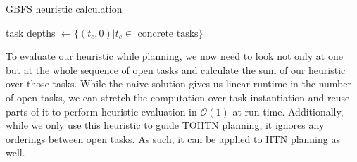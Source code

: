 \begin{algorithm}
	\caption{GBFS heuristic calculation}
	\label{algo: gbfs heuristic}
	task depths $\gets \{(t_c, 0) | t_c \in \text{ concrete tasks}\}$\;
\end{algorithm}
To evaluate our heuristic while planning, we now need to look not only at one but at the whole sequence of open tasks and calculate the sum of our heuristic over those tasks. While the naive solution gives us linear runtime in the number of open tasks, we can stretch the computation over task instantiation and reuse parts of it to perform heuristic evaluation in $\mathcal{O}(1)$ at run time.
\cite{refer to implementation chapter - we build up the sum as we instantiate new search nodes}
Additionally, while we only use this heuristic to guide TOHTN planning, it ignores any orderings between open tasks. As such, it can be applied to HTN planning as well.

